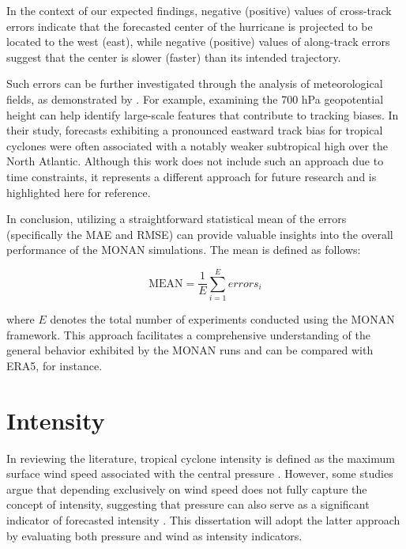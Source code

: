 In the context of our expected findings, negative (positive) values of cross-track errors indicate that the forecasted center of the hurricane is projected to be located to the west (east), while negative (positive) values of along-track errors suggest that the center is slower (faster) than its intended trajectory.

Such errors can be further investigated through the analysis of meteorological fields, as demonstrated by . For example, examining the 700 hPa geopotential height can help identify large-scale features that contribute to tracking biases. In their study, forecasts exhibiting a pronounced eastward track bias for tropical cyclones were often associated with a notably weaker subtropical high over the North Atlantic. Although this work does not include such an approach due to time constraints, it represents a different approach for future research and is highlighted here for reference.

In conclusion, utilizing a straightforward statistical mean of the errors (specifically the MAE and RMSE) can provide valuable insights into the overall performance of the MONAN simulations. The mean is defined as follows:

\begin{equation}
    \text{MEAN} = \frac{1}{E} \sum_{i=1}^{E} errors_i
\end{equation}

where $E$ denotes the total number of experiments conducted using the MONAN framework. This approach facilitates a comprehensive understanding of the general behavior exhibited by the MONAN runs and can be compared with ERA5, for instance.

\section{Intensity}

In reviewing the literature, tropical cyclone intensity is defined as the maximum surface wind speed associated with the central pressure \cite{demaria2007evaluation, landsea2013atlantic}. However, some studies argue that depending exclusively on wind speed does not fully capture the concept of intensity, suggesting that pressure can also serve as a significant indicator of forecasted intensity \cite{shepherd2017sensitivity, heming2017tropical}. This dissertation will adopt the latter approach by evaluating both pressure and wind as intensity indicators.

